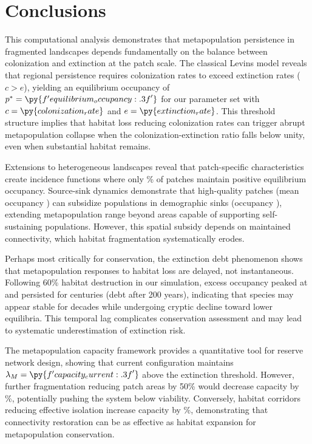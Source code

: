\documentclass[11pt,a4paper]{article}
\begin{document}
\section{Conclusions}

This computational analysis demonstrates that metapopulation persistence in fragmented landscapes depends fundamentally on the balance between colonization and extinction at the patch scale. The classical Levins model reveals that regional persistence requires colonization rates to exceed extinction rates ($c > e$), yielding an equilibrium occupancy of $p^* = \py{f'{equilibrium_occupancy:.3f}'}$ for our parameter set with $c = \py{colonization_rate}$ and $e = \py{extinction_rate}$. This threshold structure implies that habitat loss reducing colonization rates can trigger abrupt metapopulation collapse when the colonization-extinction ratio falls below unity, even when substantial habitat remains.

Extensions to heterogeneous landscapes reveal that patch-specific characteristics create incidence functions where only \% of patches maintain positive equilibrium occupancy. Source-sink dynamics demonstrate that high-quality patches (mean occupancy ) can subsidize populations in demographic sinks (occupancy ), extending metapopulation range beyond areas capable of supporting self-sustaining populations. However, this spatial subsidy depends on maintained connectivity, which habitat fragmentation systematically erodes.

Perhaps most critically for conservation, the extinction debt phenomenon shows that metapopulation responses to habitat loss are delayed, not instantaneous. Following 60\% habitat destruction in our simulation, excess occupancy peaked at  and persisted for centuries (debt  after 200 years), indicating that species may appear stable for decades while undergoing cryptic decline toward lower equilibria. This temporal lag complicates conservation assessment and may lead to systematic underestimation of extinction risk.

The metapopulation capacity framework provides a quantitative tool for reserve network design, showing that current configuration maintains $\lambda_M = \py{f'{capacity_current:.3f}'}$ above the extinction threshold. However, further fragmentation reducing patch areas by 50\% would decrease capacity by \%, potentially pushing the system below viability. Conversely, habitat corridors reducing effective isolation increase capacity by \%, demonstrating that connectivity restoration can be as effective as habitat expansion for metapopulation conservation.
\end{document}
